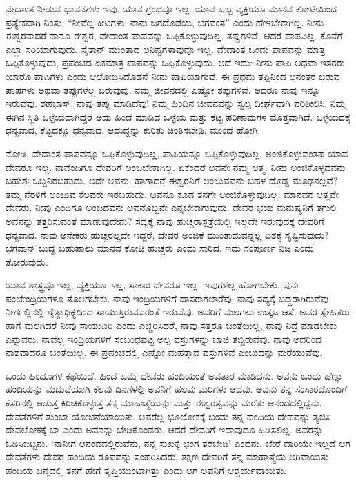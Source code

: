 ವೇದಾಂತ ನೀಡುವ ಭಾವನೆಗಳು ಇವು. ಯಾವ ಗ್ರಂಥವೂ ಇಲ್ಲ. ಯಾವ ಒಬ್ಬ ವ್ಯಕ್ತಿಯೂ ಮಾನವ ಕೋಟಿಯಿಂದ ಪ್ರತ್ಯೇಕವಾಗಿ ನಿಂತು, “ನೀವೆಲ್ಲ ಕೀಟಗಳು, ನಾನು ಜಗದೊಡೆಯ, ಭಗವಂತ'' ಎಂದು ಹೇಳಬೇಕಾಗಿಲ್ಲ. ನೀನು ಈಶ್ವರನಾದರೆ ನಾನೂ ಈಶ್ವರ, ವೇದಾಂತ ಪಾಪವನ್ನು ಒಪ್ಪಿಕೊಳ್ಳುವುದಿಲ್ಲ. ತಪ್ಪುಗಳಿವೆ, ಆದರೆ ಪಾಪವಿಲ್ಲ. ಕೊನೆಗೆ ಎಲ್ಲಾ ಸರಿಯಾಗುವುದು. ಸೈತಾನ್ ಮುಂತಾದ ಅನಿಷ್ಟಗಳಾವುವೂ ಇಲ್ಲ. ವೇದಾಂತ ಒಂದು ಪಾಪವನ್ನು ಮಾತ್ರ ಒಪ್ಪಿಕೊಳ್ಳುವುದು, ಪ್ರಪಂಚದ ಏಕಮಾತ್ರ ಪಾಪವನ್ನು ಒಪ್ಪಿಕೊಳ್ಳುವುದು. ಅದೆ ಇದು: ನೀನು ಪಾಪಿ ಅಥವಾ ಇತರರು ಯಾರೊ ಪಾಪಿಗಳು ಎಂದು ಆಲೋಚಿಸಿದೊಡನೆ ನೀನು ಪಾಪಿಯಾಗುವೆ. ಈ ಪ್ರಥಮ ತಪ್ಪಿನಿಂದ ಅನಂತರ ಬರುವ ಪಾಪಗಳು ಅಥವಾ ತಪ್ಪುಗಳೆಲ್ಲ ಬರುವುವು. ನಮ್ಮ ಜೀವನದಲ್ಲಿ ಎಷ್ಟೋ ತಪ್ಪುಗಳಿವೆ. ಆದರೂ ನಾವು ಇನ್ನೂ ಇರುವೆವು. ಶಹಭಾಸ್, ನಾವು ತಪ್ಪು ಮಾಡಿದೆವು! ನಿಮ್ಮ ಹಿಂದಿನ ಜೀವನವನ್ನು ಸ್ವಲ್ಪ ದೀರ್ಘವಾಗಿ ಪರಿಶೀಲಿಸಿ. ನಿಮ್ಮ ಈಗಿನ ಸ್ಥಿತಿ ಒಳ್ಳೆಯದಾಗಿದ್ದರೆ ಅದು ಹಿಂದೆ ಮಾಡಿದ ಒಳ್ಳೆಯ ಮತ್ತು ಕೆಟ್ಟ ಪರಿಣಾಮಗಳ ಮೊತ್ತವಾಗಿದೆ. ಒಳ್ಳೆಯದಕ್ಕೆ ಧನ್ಯವಾದ, ಕೆಟ್ಟದಕ್ಕೂ ಧನ್ಯವಾದ. ಆದುದ್ದನ್ನು ಕುರಿತು ಚಿಂತಿಸಬೇಡಿ. ಮುಂದೆ ಹೋಗಿ.

ನೋಡಿ, ವೇದಾಂತ ಪಾಪವನ್ನೂ ಒಪ್ಪಿಕೊಳ್ಳುವುದಿಲ್ಲ, ಪಾಪಿಯನ್ನೂ ಒಪ್ಪಿಕೊಳ್ಳುವುದಿಲ್ಲ. ಅಂಜಿಕೊಳ್ಳುವಂತಹ ಯಾವ ದೇವರೂ ಇಲ್ಲ. ನಾವೆಂದಿಗೂ ದೇವರಿಗೆ ಅಂಜಬೇಕಾಗಿಲ್ಲ. ಏಕೆಂದರೆ ಅವನೇ ನಮ್ಮ ಆತ್ಮ. ನೀನು ಅಂಜಿಕೊಳ್ಳದವನು ಬಹುಶಃ ಒಬ್ಬನಿರಬಹುದು. ಅದೇ ಅವನು. ಹಾಗಾದರೆ ಈಶ್ವರನಿಗೆ ಅಂಜುವವನು ಬಹಳ ದೊಡ್ಡ ಮೂಢನಲ್ಲವೆ? ತಮ್ಮ ನೆರಳಿಗೆ ಅಂಜುವ ಕೆಲವರು ಇರಬಹುದು. ಅವನೂ ಕೂಡ ತನಗೇ ಅಂಜಿಕೊಳ್ಳುವುದಿಲ್ಲ. ಮಾನವನ ಆತ್ಮವೇ ದೇವರು. ನೀವು ಎಂದಿಗೂ ಅಂಜದವನು ಅವನೊಬ್ಬನೇ ಎನ್ನಬೇಕಾಗುವುದು. ದೇವರ ಭಯ ಮನುಷ್ಯನಿಗೆ ತಗುಲಿ ಅವನನ್ನು ತತ್ತರಿಸುವಂತೆ ಮಾಡುವುದೇನು? ಸದ್ಯಕ್ಕೆ ನಾವು ಹುಚ್ಚರಾಸ್ಪತ್ರೆಯಲ್ಲಿ ಇಲ್ಲದೇ ಇರುವುದಕ್ಕೆ ದೇವರಿಗೆ ಧನ್ಯವಾದ. ನಾವು ಅನೇಕರು ಹುಚ್ಚರಲ್ಲದೇ ಇದ್ದರೆ, ದೇವರ ಅಂಜಿಕೆ ಮುಂತಾದುವನ್ನೆಲ್ಲ ಏತಕ್ಕೆ ಸೃಷ್ಟಿಸುವುದು? ಭಗವಾನ್ ಬುದ್ದ ಬಹುಪಾಲು ಮಾನವ ಕೋಟಿ ಹುಚ್ಚರು ಎಂದು ಸಾರಿದ. ಇದು ಸಂಪೂರ್ಣ ನಿಜ ಎಂದು ತೋರುವುದು.

ಯಾವ ಶಾಸ್ತ್ರವೂ ಇಲ್ಲ, ವ್ಯಕ್ತಿಯೂ ಇಲ್ಲ, ಸಾಕಾರ ದೇವರೂ ಇಲ್ಲ. ಇವುಗಳೆಲ್ಲ ಹೋಗಬೇಕು. ಪುನಃ ಪಂಚೇಂದ್ರಿಯಗಳೂ ತೊಲಗಬೇಕು. ನಾವು ಇಂದ್ರಿಯಗಳಿಗೆ ದಾಸರಾಗಲಾರೆವು. ನಾವು ಸದ್ಯಕ್ಕೆ ಬದ್ಧರಾಗಿರುವೆವು. ನೀರ್ಗಲ್ಲಿನಲ್ಲಿ ಶೈತ್ಯಾಧಿಕ್ಯದಿಂದ ಸಾಯುತ್ತಿರುವವರಂತೆ ಇರುವೆವು. ಅವರಿಗೆ ಮಲಗಲು ಉತ್ಕಟ ಆಸೆ. ಅವರ ಸ್ನೇಹಿತರು ಹಾಗೆ ಮಲಗಿದರೆ ನೀವು ಸಾಯುವಿರಿ ಎಂದು ಎಚ್ಚರಿಸಿದರೆ, ನಾವು ಸತ್ತರೂ ಚಿಂತೆಯಿಲ್ಲ, ನಾವು ನಿದ್ರೆ ಮಾಡಬೇಕು ಎನ್ನುವರು. ನಾವೆಲ್ಲ ಇಂದ್ರಿಯಗಳಿಗೆ ಸಂಬಂಧಪಟ್ಟ ಅಲ್ಪ ವಸ್ತುಗಳನ್ನು ಬಾಚಿ ತಬ್ಬಿರುವೆವು. ನಾವು ಅದರಿಂದ ನಾಶವಾದರೂ ಚಿಂತೆಯಿಲ್ಲ. ಈ ಪ್ರಪಂಚದಲ್ಲಿ ಎಷ್ಟೋ ಮಹತ್ತಾದ ವಸ್ತುಗಳಿವೆ ಎಂಬುದನ್ನು ಮರೆಯುವೆವು.

ಒಂದು ಹಿಂದೂಗಳ ಕಥೆಯಿದೆ. ಹಿಂದೆ ಒಮ್ಮೆ ದೇವರು ಹಂದಿಯಂತೆ ಅವತಾರ ಮಾಡಿದನು. ಅವನು ಒಂದು ಹೆಣ್ಣು ಹಂದಿಯನ್ನು ಮದುವೆಯಾಗಿ ಕೆಲವು ದಿನಗಳಲ್ಲಿ ಅವನಿಗೆ ಹಲವು ಮರಿಗಳು ಆದವು. ಅವನು ತನ್ನ ಸಂಸಾರದೊಂದಿಗೆ ಕೆಸರಿನಲ್ಲಿ ಆಡುತ್ತ ಕಿರಿಚಿಕೊಳ್ಳುತ್ತ ತನ್ನ ಮಾಹಾತ್ಮೆಯನ್ನು ಮತ್ತು ಈಶ್ವರತ್ವವನ್ನು ಮರೆತು ಆನಂದದಲ್ಲಿದ್ದನು. ದೇವತೆಗಳಿಗೆ ತುಂಬಾ ಯೋಚನೆಯಾಯಿತು. ಅವರೆಲ್ಲ ಭೂಲೋಕಕ್ಕೆ ಬಂದು ತನ್ನ ಹಂದಿಯ ದೇಹವನ್ನು ತ್ಯಜಿಸಿ ದೇವಲೋಕಕ್ಕೆ ಬಾ ಎಂದು ಅವನನ್ನು ಬೇಡಿಕೊಂಡರು. ಆದರೆ ದೇವರಿಗೆ ಇದಾವುದೂ ಹಿಡಿಸಲಿಲ್ಲ. ಅವರನ್ನು ಓಡಿಸಿಬಿಟ್ಟನು. `ನಾನೀಗ ಆನಂದದಲ್ಲಿರುವೆನು, ನನ್ನ ಸುಖಕ್ಕೆ ಭಂಗ ತರಬೇಡಿ' ಎಂದನು. ಬೇರೆ ದಾರಿಯೇ ಇಲ್ಲದೆ ಆಗ ದೇವತೆಗಳು ದೇವರ ಹಂದಿಯ ರೂಪವನ್ನು ಸಂಹರಿಸಿದರು. ತಕ್ಷಣ ದೇವರಿಗೆ ತನ್ನ ಮಾಹಾತ್ಮೆಯ ಅರಿವಾಯಿತು. ಹಂದಿಯ ಜನ್ಮದಲ್ಲಿ ತನಗೆ ಹೇಗೆ ತೃಪ್ತಿಯುಂಟಾಗಿತ್ತು ಎಂದು ಆಗ ಅವನಿಗೆ ಆಶ್ಚರ್ಯವಾಯಿತು.


